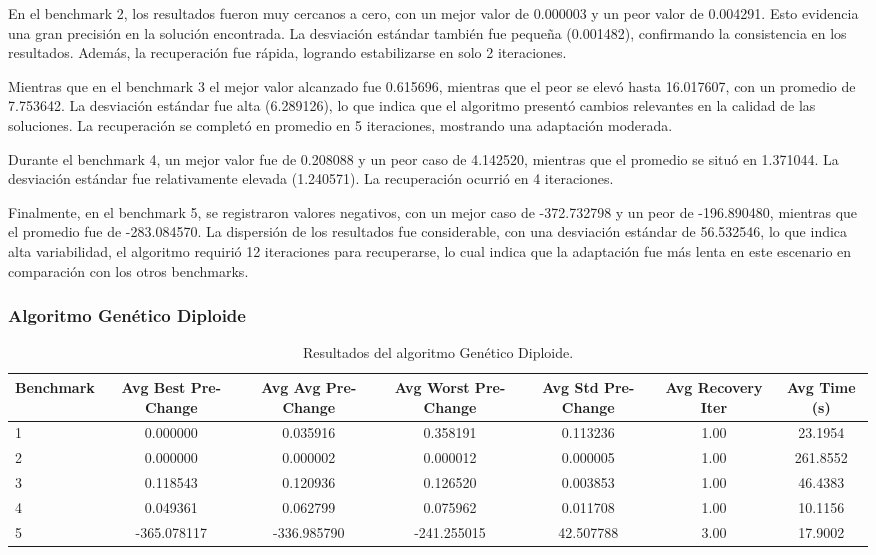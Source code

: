\documentclass[10pt]{article}
\begin{document}
En el benchmark 2, los resultados fueron muy cercanos a cero, con un mejor valor de 0.000003 y un peor valor de 0.004291. Esto evidencia una gran precisión en la solución encontrada. La desviación estándar también fue pequeña (0.001482), confirmando la consistencia en los resultados. Además, la recuperación fue rápida, logrando estabilizarse en solo 2 iteraciones.

Mientras que en el benchmark 3 el mejor valor alcanzado fue 0.615696, mientras que el peor se elevó hasta 16.017607, con un promedio de 7.753642. La desviación estándar fue alta (6.289126), lo que indica que el algoritmo presentó cambios relevantes en la calidad de las soluciones. La recuperación se completó en promedio en 5 iteraciones, mostrando una adaptación moderada.

Durante el benchmark 4, un mejor valor fue de 0.208088 y un peor caso de 4.142520, mientras que el promedio se situó en 1.371044. La desviación estándar fue relativamente elevada (1.240571). La recuperación ocurrió en 4 iteraciones.

Finalmente, en el benchmark 5, se registraron valores negativos, con un mejor caso de -372.732798 y un peor de -196.890480, mientras que el promedio fue de -283.084570. La dispersión de los resultados fue considerable, con una desviación estándar de 56.532546, lo que indica alta variabilidad, el algoritmo requirió 12 iteraciones para recuperarse, lo cual indica que la adaptación fue más lenta en este escenario en comparación con los otros benchmarks.


\subsubsection*{Algoritmo Genético Diploide}
\begin{table}[H]
\centering
\caption{Resultados del algoritmo Genético Diploide.}
\label{tab:ga-diploid}
\scriptsize
\begin{tabular}{lcccccc}
\toprule
\textbf{Benchmark} & \textbf{Avg Best Pre-Change} & \textbf{Avg Avg Pre-Change} & \textbf{Avg Worst Pre-Change} & \textbf{Avg Std Pre-Change} & \textbf{Avg Recovery Iter} & \textbf{Avg Time (s)} \\
\midrule
1 & 0.000000 & 0.035916 & 0.358191 & 0.113236 & 1.00 & 23.1954 \\
2 & 0.000000 & 0.000002 & 0.000012 & 0.000005 & 1.00 & 261.8552 \\
3 & 0.118543 & 0.120936 & 0.126520 & 0.003853 & 1.00 & 46.4383 \\
4 & 0.049361 & 0.062799 & 0.075962 & 0.011708 & 1.00 & 10.1156 \\
5 & -365.078117 & -336.985790 & -241.255015 & 42.507788 & 3.00 & 17.9002 \\
\bottomrule
\end{tabular}
\end{table}
\end{document}

